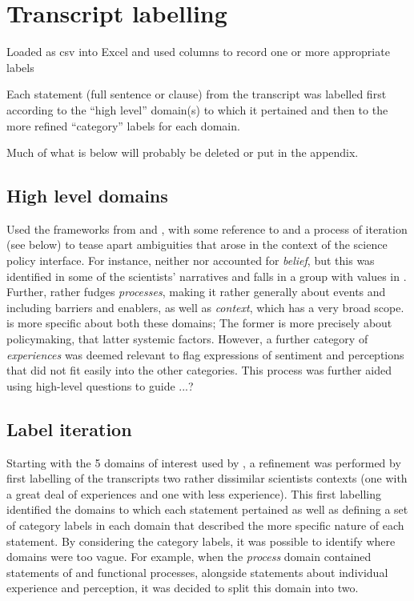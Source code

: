 \section{Transcript labelling}

Loaded as csv into Excel and used columns to record one or more appropriate labels

Each statement (full sentence or clause) from the transcript was labelled first according to the ``high level'' domain(s) to which it pertained and then to the more refined ``category'' labels for each domain.

 Much of what is below will probably be deleted or put in the appendix.



\subsection{High level domains}
Used the frameworks from \textcite{BuseMW2012} and \textcite{HaynesDCRHGS2011}, with some reference to \textcite{DarntonH2013} and a process of iteration (see below) to tease apart ambiguities that arose in the context of the science policy interface. For instance, neither \textcite{BuseMW2012} nor \textcite{HaynesDCRHGS2011} accounted for \emph{belief}, but this was identified in some of the scientists' narratives and falls in a group with values in \textcite{DarntonH2013}. Further, \textcite{HaynesDCRHGS2011} rather fudges \emph{processes}, making it rather generally about events and including barriers and enablers, as well as \emph{context}, which has a very broad scope. \textcite{BuseMW2012} is more specific about both these domains; The former is more precisely about policymaking, that latter systemic factors. However, a further category of \emph{experiences} was deemed relevant to flag expressions of sentiment and perceptions that did not fit easily into the other categories. This process was further aided using high-level questions to guide ...?

\subsection{Label iteration}
Starting with the 5 domains of interest used by \textcite{HaynesDCRHGS2011}, a refinement was performed by first labelling of the transcripts two rather dissimilar scientists contexts (one with a great deal of experiences and one with less experience). This first labelling identified the domains to which each statement pertained as well as defining a set of category labels in each domain that described the more specific nature of each statement. By considering the category labels, it was possible to identify where domains were too vague. For example, when the \emph{process} domain contained statements of and functional processes, alongside statements about individual experience and perception, it was decided to split this domain into two.

